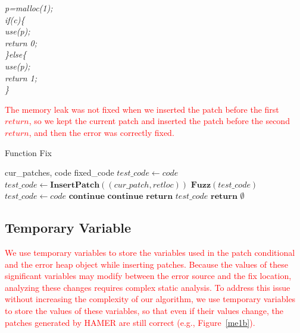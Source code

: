 \documentclass[a4paper,11pt,oneside,openany]{book}
\begin{document}
\begin{minipage}{\textwidth}
    \vspace{0.2cm}
    \textsl{\hspace{0.3cm}p=malloc(1);\\\hspace{0.3cm}if(c)\{\\\hspace{0.6cm}use(p);\\\hspace{0.6cm}return 0;\\\hspace{0.3cm}\}else\{\\\hspace{0.6cm}use(p);\\\hspace{0.6cm}return 1;\\\hspace{0.3cm}\}}
\end{minipage}
\textcolor{red}{
The memory leak was not fixed when we inserted the patch before the first $return$, so we kept the current patch and inserted the patch before the second $return$, and then the error was correctly fixed.
}


 \begin{algorithm}[h]
 \caption{Function Fix}
 \label{funcfix}
 \begin{algorithmic}[1]
 \renewcommand{\algorithmicrequire}{\textbf{Input:}}
 \renewcommand{\algorithmicensure}{\textbf{Output:}}
 \REQUIRE cur\_patches, code
 \ENSURE  fixed\_code
  \STATE $test\_code \gets code$
    \STATE $test\_code \gets \textbf{InsertPatch}((cur\_patch,retloc))$
    \STATE $\textbf{Fuzz}(test\_code)$
     \STATE $test\_code \gets code$
     \STATE $\textbf{continue}$
     \STATE $\textbf{continue}$
    \ELSE 
     \STATE $\textbf{return}$ $test\_code$
    \ENDIF
   \ENDFOR
  \ENDFOR
  \STATE $\textbf{return}$ $\emptyset$
 \end{algorithmic} 
 \end{algorithm}

\subsection{Temporary Variable}
\textcolor{red}{
We use temporary variables to store the variables used in the patch conditional and the error heap object while inserting patches. Because the values of these significant variables may modify between the error source and the fix location, analyzing these changes requires complex static analysis. To address this issue without increasing the complexity of our algorithm, we use temporary variables to store the values of these variables, so that even if their values change, the patches generated by HAMER are still correct (e.g., Figure~\ref{me1b}).
}
\end{document}
